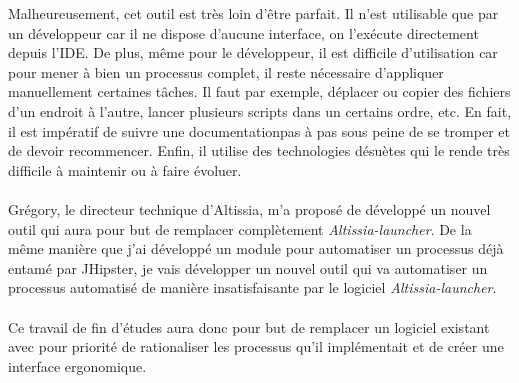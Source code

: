 Malheureusement, cet outil est très loin d'être parfait.
Il n'est utilisable que par un développeur car il ne dispose d'aucune interface, on l'exécute directement depuis l'IDE\footnotemark.
De plus, même pour le développeur, il est difficile d'utilisation car pour mener à bien un processus complet, il reste nécessaire d'appliquer manuellement certaines tâches.
Il faut par exemple, déplacer ou copier des fichiers d'un endroit à l'autre, lancer plusieurs scripts dans un certains ordre, etc.
En fait, il est impératif de suivre une documentation\footnotemark pas à pas sous peine de se tromper et de devoir recommencer.
Enfin, il utilise des technologies désuètes qui le rende très difficile à maintenir ou à faire évoluer.


\paragraph{}
Grégory, le directeur technique d'Altissia, m'a proposé de développé un nouvel outil qui aura pour but de remplacer complètement \textit{Altissia-launcher}.
De la même manière que j'ai développé un module pour automatiser un processus déjà entamé par JHipster,
je vais développer un nouvel outil qui va automatiser un processus automatisé de manière insatisfaisante par le logiciel \textit{Altissia-launcher}.

\paragraph{}
Ce travail de fin d'études aura donc pour but de remplacer un logiciel existant avec pour priorité de rationaliser les processus qu'il implémentait et de créer une interface ergonomique.
